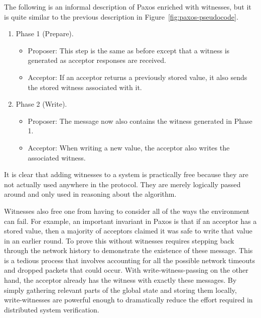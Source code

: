 The following is an informal description of Paxos enriched with witnesses, but it is quite similar
to the previous description in Figure~\ref{fig:paxos-pseudocode}.
\begin{enumerate}
\item Phase 1 (Prepare).
\begin{itemize}
\item Proposer: This step is the same as before except that a witness is generated as acceptor responses are received.
\item Acceptor: If an acceptor returns a previously stored value, it also sends the stored witness associated with it.
\end{itemize}
\item Phase 2 (Write).
\begin{itemize}
\item Proposer: The message now also contains the witness generated in Phase 1.
\item Acceptor: When writing a new value, the acceptor also writes the associated witness.
\end{itemize}
\end{enumerate}
It is clear that adding witnesses to a system is practically free because they are not actually used anywhere in the protocol.
They are merely logically passed around and only used in reasoning about the algorithm.

Witnesses also free one from having to consider all of the ways the environment can fail.
For example, an important invariant in Paxos is that if an acceptor has a stored value, then a majority of acceptors
claimed it was safe to write that value in an earlier round.
To prove this without witnesses requires stepping back through the network history to demonstrate the existence of these message.
This is a tedious process that involves accounting for all the possible network timeouts and dropped packets that could occur.
With write-witness-passing on the other hand, the acceptor already has the witness with exactly these messages.
By simply gathering relevant parts of the global state and storing them locally, write-witnesses are
powerful enough to dramatically reduce the effort required in distributed system verification.
